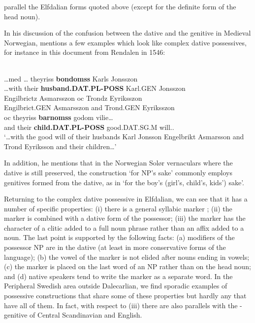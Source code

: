 parallel the Elfdalian forms quoted above (except for the definite form of the head noun).

In his discussion of the confusion between the dative and the genitive in Medieval Norwegian, \citet{Larsen1895} mentions a few examples which look like complex dative possessives, for instance in this document from Rendalen in 1546:

\ea\label{}
\\
\gll …med  …  theyriss  \textbf{bondomss} Karls  Jonsszon\\
…with    their  \textbf{husband.DAT.PL-POSS} Karl.GEN  Jonsszon\\
\gll Engilbrictz  Asmarsszon  oc  Trondz  Eyriksszon\\
Engilbrict.GEN  Asmarsszon  and  Trond.GEN   Eyriksszon\\
\gll oc  theyriss  \textbf{barnomss}  godom  vilie…\\
and  their  \textbf{child.DAT.PL-POSS} good.DAT.SG.M  will..\\
\glt ‘…with the good will of their husbands Karl Jonsson Engelbrikt Asmarsson and Trond Eyriksson and their children…’
\z

In addition, he mentions that in the Norwegian Solør vernaculars where the dative is still preserved, the construction ‘for NP’s sake’ commonly employs genitives formed from the dative, as in  ‘for the boy’s (girl’s, child’s, kids’) sake’. 

Returning to the complex dative possessive in Elfdalian, we can see that it has a number of specific properties: (i) there is a general syllabic marker ; (ii) the marker is combined with a dative form of the possessor; (iii) the marker has the character of a clitic added to a full noun phrase rather than an affix added to a noun. The last point is supported by  the following facts: (a) modifiers of the possessor NP are in the dative (at least in more conservative forms of the language); (b) the vowel of the marker is not elided after nouns ending in vowels; (c) the marker is placed on the last word of an NP rather than on the head noun; and (d) native speakers tend to write the marker as a separate word. In the Peripheral Swedish area outside Dalecarlian, we find sporadic examples of possessive constructions that share some of these properties but hardly any that have all of them. In fact, with respect to (iii) there are also parallels with the -genitive of Central Scandinavian and English. 

